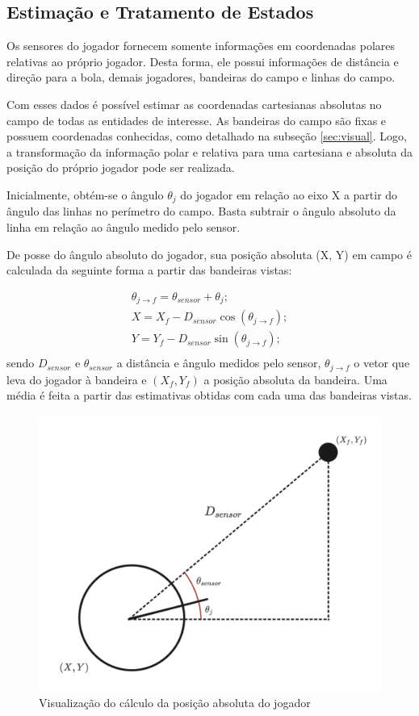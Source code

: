 \subsection{Estimação e Tratamento de Estados}

\par Os sensores do jogador fornecem somente informações em coordenadas polares relativas ao próprio jogador. Desta forma, ele possui informações de distância e direção para a bola, demais jogadores, bandeiras do campo e linhas do campo.

\par Com esses dados é possível estimar as coordenadas cartesianas absolutas no campo de todas as entidades de interesse. As bandeiras do campo são fixas e possuem coordenadas conhecidas, como detalhado na subseção \ref{sec:visual}. Logo, a transformação da informação polar e relativa para uma cartesiana e absoluta da posição do próprio jogador pode ser realizada.

Inicialmente, obtém-se o ângulo $\theta_j$ do jogador em relação ao eixo X a partir do ângulo das linhas no perímetro do campo. Basta subtrair o ângulo absoluto da linha em relação ao ângulo medido pelo sensor.

De posse do ângulo absoluto do jogador, sua posição absoluta (X, Y) em campo é calculada da seguinte forma a partir das bandeiras vistas:

\begin{equation}
	\label{eq:playerpos}
	\begin{array}{ll}
		\theta_{j \to f} = \theta_{sensor} + \theta_j; \\
		X = X_f - D_{sensor} \cos(\theta_{j \to f}); \\
		Y = Y_f - D_{sensor} \sin(\theta_{j \to f}); \\
	\end{array}
\end{equation}
% 
sendo $D_{sensor}$ e $\theta_{sensor}$ a distância e ângulo medidos pelo sensor, $\theta_{j \to f}$ o vetor que leva do jogador à bandeira e $(X_f, Y_f)$ a posição absoluta da bandeira. Uma média é feita a partir das estimativas obtidas com cada uma das bandeiras vistas. 

\begin{figure}[H]
	\includegraphics[width=0.6\linewidth]{figs/trig-transf.png}
	\centering
	\caption{Visualização do cálculo da posição absoluta do jogador}
	\label{fig:trig}
\end{figure}

